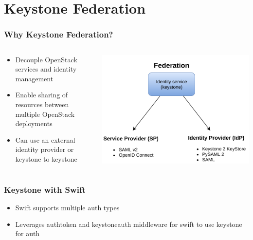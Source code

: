 \documentclass[aspectratio=169,11pt,hyperref={colorlinks=true}]{beamer}
\begin{document}
\section{Keystone Federation}
\begin{frame}
    \frametitle{Why Keystone Federation?}
    \begin{columns}
    \begin{column}{.48\textwidth}
    \begin{itemize}
        \item Decouple OpenStack services and identity management
        \item Enable sharing of resources between multiple OpenStack deployments
        \item Can use an external identity provider or keystone to keystone
    \end{itemize}
    \end{column}
    \begin{column}{.48\textwidth}
        \includegraphics[width=.85\textwidth]{keystone-federation.png}
    \end{column}
    \end{columns}
\end{frame}

\begin{frame}
    \frametitle{Keystone with Swift}
    \begin{itemize}
        \item Swift supports multiple auth types
        \item Leverages authtoken and keystoneauth middleware for swift to use keystone for auth
    \end{itemize}
\end{frame}
\end{document}
